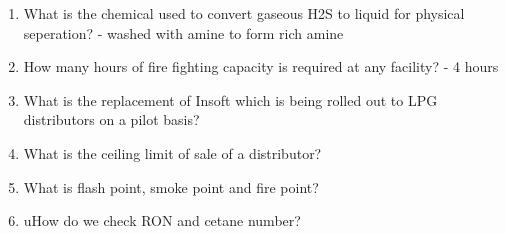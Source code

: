 \documentclass{report}
\begin{document}
\begin{enumerate}
		\item What is the chemical used to convert gaseous H2S to liquid for physical seperation? - washed with amine to form rich amine
		\item How many hours of fire fighting capacity is required at any facility? - 4 hours
		\item What is the replacement of Insoft which is being rolled out to LPG distributors on a pilot basis?
		\item What is the ceiling limit of sale of a distributor?
		\item What is flash point, smoke point and fire point?
		\item uHow do we check RON and cetane number?
	\end{enumerate}
\end{document}
